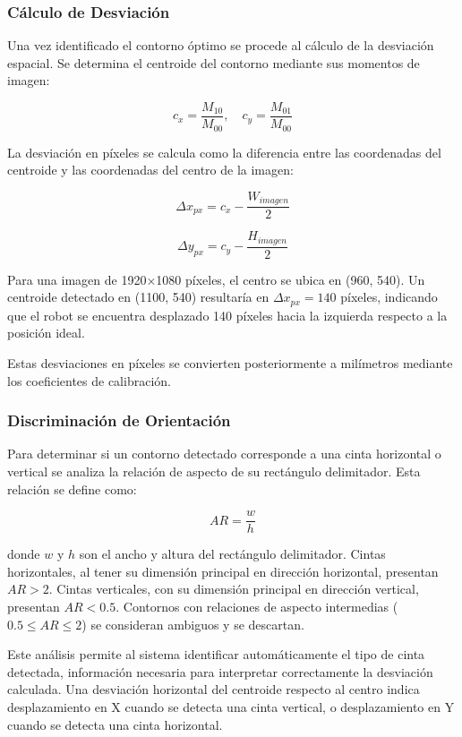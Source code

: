 \subsubsection{Cálculo de Desviación}

Una vez identificado el contorno óptimo se procede al cálculo de la desviación espacial. Se determina el centroide del contorno mediante sus momentos de imagen:

\begin{equation}
c_x = \frac{M_{10}}{M_{00}}, \quad c_y = \frac{M_{01}}{M_{00}}
\end{equation}

La desviación en píxeles se calcula como la diferencia entre las coordenadas del centroide y las coordenadas del centro de la imagen:

\begin{equation}
\Delta x_{px} = c_x - \frac{W_{imagen}}{2}
\end{equation}

\begin{equation}
\Delta y_{px} = c_y - \frac{H_{imagen}}{2}
\end{equation}

Para una imagen de 1920×1080 píxeles, el centro se ubica en (960, 540). Un centroide detectado en (1100, 540) resultaría en $\Delta x_{px} = 140$ píxeles, indicando que el robot se encuentra desplazado 140 píxeles hacia la izquierda respecto a la posición ideal.

Estas desviaciones en píxeles se convierten posteriormente a milímetros mediante los coeficientes de calibración.

\subsubsection{Discriminación de Orientación}

Para determinar si un contorno detectado corresponde a una cinta horizontal o vertical se analiza la relación de aspecto de su rectángulo delimitador. Esta relación se define como:

\begin{equation}
AR = \frac{w}{h}
\end{equation}

donde $w$ y $h$ son el ancho y altura del rectángulo delimitador. Cintas horizontales, al tener su dimensión principal en dirección horizontal, presentan $AR > 2$. Cintas verticales, con su dimensión principal en dirección vertical, presentan $AR < 0.5$. Contornos con relaciones de aspecto intermedias ($0.5 \leq AR \leq 2$) se consideran ambiguos y se descartan.

Este análisis permite al sistema identificar automáticamente el tipo de cinta detectada, información necesaria para interpretar correctamente la desviación calculada. Una desviación horizontal del centroide respecto al centro indica desplazamiento en X cuando se detecta una cinta vertical, o desplazamiento en Y cuando se detecta una cinta horizontal.
